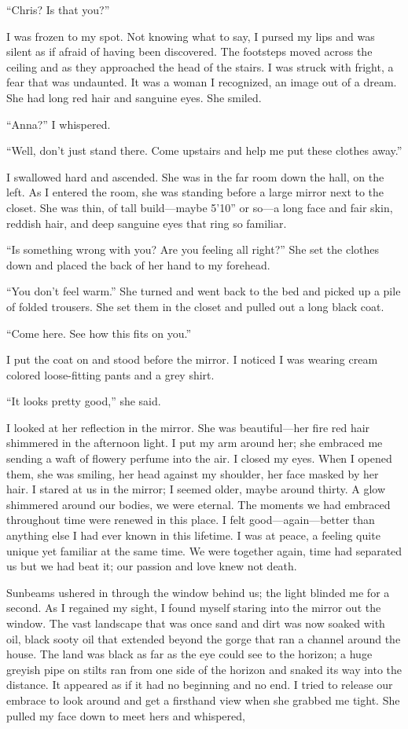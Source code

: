 ``Chris? Is that you?''

I was frozen to my spot. Not knowing what to say, I pursed my lips and
was silent as if afraid of having been discovered. The footsteps moved
across the ceiling and as they approached the head of the stairs. I was
struck with fright, a fear that was undaunted. It was a woman I
recognized, an image out of a dream. She had long red hair and sanguine
eyes. She smiled.

``Anna?'' I whispered.

``Well, don't just stand there. Come upstairs and help me put these
clothes away.''

I swallowed hard and ascended. She was in the far room down the hall, on
the left. As I entered the room, she was standing before a large mirror
next to the closet. She was thin, of tall build---maybe 5'10'' or so---a
long face and fair skin, reddish hair, and deep sanguine eyes that ring
so familiar.

``Is something wrong with you? Are you feeling all right?'' She set the
clothes down and placed the back of her hand to my forehead.

``You don't feel warm.'' She turned and went back to the bed and picked
up a pile of folded trousers. She set them in the closet and pulled out
a long black coat.

``Come here. See how this fits on you.''

I put the coat on and stood before the mirror. I noticed I was wearing
cream colored loose-fitting pants and a grey shirt.

``It looks pretty good,'' she said.

I looked at her reflection in the mirror. She was beautiful---her fire
red hair shimmered in the afternoon light. I put my arm around her; she
embraced me sending a waft of flowery perfume into the air. I closed my
eyes. When I opened them, she was smiling, her head against my shoulder,
her face masked by her hair. I stared at us in the mirror; I seemed
older, maybe around thirty. A glow shimmered around our bodies, we were
eternal. The moments we had embraced throughout time were renewed in
this place. I felt good---again---better than anything else I had ever
known in this lifetime. I was at peace, a feeling quite unique yet
familiar at the same time. We were together again, time had separated us
but we had beat it; our passion and love knew not death.

Sunbeams ushered in through the window behind us; the light blinded me
for a second. As I regained my sight, I found myself staring into the
mirror out the window. The vast landscape that was once sand and dirt
was now soaked with oil, black sooty oil that extended beyond the gorge
that ran a channel around the house. The land was black as far as the
eye could see to the horizon; a huge greyish pipe on stilts ran from one
side of the horizon and snaked its way into the distance. It appeared as
if it had no beginning and no end. I tried to release our embrace to
look around and get a firsthand view when she grabbed me tight. She
pulled my face down to meet hers and whispered,

